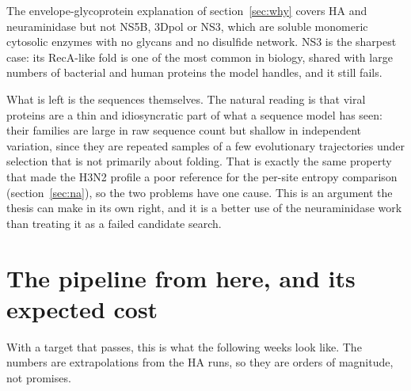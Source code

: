 \documentclass[11pt,a4paper]{article}
\begin{document}
The envelope-glycoprotein explanation of section~\ref{sec:why} covers HA and
neuraminidase but not NS5B, 3Dpol or NS3, which are soluble monomeric cytosolic
enzymes with no glycans and no disulfide network. NS3 is the sharpest case: its
RecA-like fold is one of the most common in biology, shared with large numbers
of bacterial and human proteins the model handles, and it still fails.

What is left is the sequences themselves. The natural reading is that viral
proteins are a thin and idiosyncratic part of what a sequence model has seen:
their families are large in raw sequence count but shallow in independent
variation, since they are repeated samples of a few evolutionary trajectories
under selection that is not primarily about folding. That is exactly the same
property that made the H3N2 profile a poor reference for the per-site entropy
comparison (section~\ref{sec:na}), so the two problems have one cause. This is
an argument the thesis can make in its own right, and it is a better use of the
neuraminidase work than treating it as a failed candidate search.

\section{The pipeline from here, and its expected cost}\label{sec:pipeline}

With a target that passes, this is what the following weeks look like. The
numbers are extrapolations from the HA runs, so they are orders of magnitude, not
promises.
\end{document}
